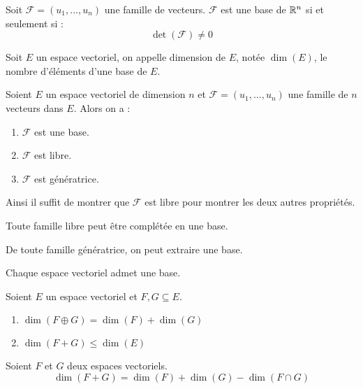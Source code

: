 \begin{proposition}
	Soit $\mathcal{F} = (u_1, \ldots, u_n)$ une famille de vecteurs. $\mathcal{F}$ est une base de $\mathbb{R}^n$ si et seulement si :
	\[ \det(\mathcal{F}) \neq 0 \]
\end{proposition}

\begin{definition}
	Soit $E$ un espace vectoriel, on appelle dimension de $E$, notée $\dim(E)$, le nombre d'éléments d'une base de $E$. 
\end{definition}


\begin{proposition}
	Soient $E$ un espace vectoriel de dimension $n$ et $\mathcal{F} = (u_1, \ldots, u_n)$ une famille de $n$ vecteurs dans $E$. Alors on a :
	\begin{multicols}{3}
	    \begin{enumerate}
		\item $\mathcal{F}$ est une base.
		\item $\mathcal{F}$ est libre.
		\item $\mathcal{F}$ est génératrice.
	\end{enumerate}
	\end{multicols}
	\noindent Ainsi il suffit de montrer que $\mathcal{F}$ est libre pour montrer les deux autres propriétés.
\end{proposition}

\begin{theorem}
	Toute famille libre peut être complétée en une base.
\end{theorem}

\begin{theorem}
    De toute famille génératrice, on peut extraire une base.
\end{theorem}

\begin{theorem}
    Chaque espace vectoriel admet une base.
\end{theorem}

\begin{proposition}
	Soient $E$ un espace vectoriel et $F, G\subseteq E$.
	\begin{multicols}{2}
	    \begin{enumerate}
    		\item $\dim(F \oplus G) = \dim(F) + \dim(G)$ 
    		\item $\dim(F + G) \leq \dim(E)$
    	\end{enumerate}
	\end{multicols}
\end{proposition}

\begin{theorem}
	Soient $F$ et $G$ deux espaces vectoriels.
	\[ \dim(F+G) = \dim(F) + \dim(G) - \dim(F\cap G) \]
\end{theorem}

